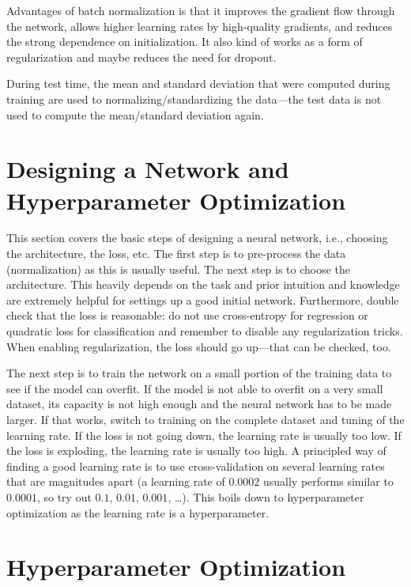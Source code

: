 			Advantages of batch normalization is that it improves the gradient flow through the network, allows higher learning rates by high-quality gradients, and reduces the strong dependence on initialization. It also kind of works as a form of regularization and maybe reduces the need for dropout.

			During test time, the mean and standard deviation that were computed during training are used to normalizing/standardizing the data---the test data is not used to compute the mean/standard deviation again.

	\section{Designing a Network and Hyperparameter Optimization}
		This section covers the basic steps of designing a neural network, i.e., choosing the architecture, the loss, etc. The first step is to pre-process the data (normalization) as this is usually useful. The next step is to choose the architecture. This heavily depends on the task and prior intuition and knowledge are extremely helpful for settings up a good initial network. Furthermore, double check that the loss is reasonable: do not use cross-entropy for regression or quadratic loss for classification and remember to disable any regularization tricks. When enabling regularization, the loss should go up---that can be checked, too.

		The next step is to train the network on a small portion of the training data to see if the model can overfit. If the model is not able to overfit on a very small dataset, its capacity is not high enough and the neural network has to be made larger. If that works, switch to training on the complete dataset and tuning of the learning rate. If the loss is not going down, the learning rate is usually too low. If the loss is exploding, the learning rate is usually too high. A principled way of finding a good learning rate is to use cross-validation on several learning rates that are magnitudes apart (a learning rate of \(0.0002\) usually performs similar to \(0.0001\), so try out \(0.1\), \(0.01\), \(0.001\), \dots). This boils down to hyperparameter optimization as the learning rate is a hyperparameter.

		\section{Hyperparameter Optimization}
			\label{subsec:hyperparameterOpt}

